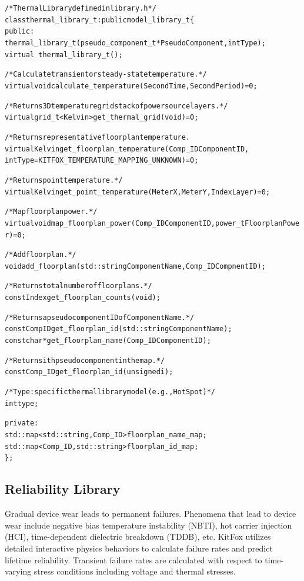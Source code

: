 {
\fontsize{10pt}{11pt}\selectfont
\begin{alltt}
/* Thermal Library defined in library.h */
class thermal_library_t : public model_library_t \{
public:
    thermal_library_t(pseudo_component_t *PseudoComponent, int Type);
    virtual ~thermal_library_t();

    /* Calculate transient or steady-state temperature. */
    virtual void calculate_temperature(Second Time, Second Period)=0;

    /* Returns 3D temperature grid stack of power source layers. */
    virtual grid_t<Kelvin> get_thermal_grid(void)=0;

    /* Returns representative floorplan temperature.
    virtual Kelvin get_floorplan_temperature(Comp_ID ComponentID, 
                                             int Type=KITFOX_TEMPERATURE_MAPPING_UNKNOWN)=0;

    /* Returns point temperature. */
    virtual Kelvin get_point_temperature(Meter X, Meter Y, Index Layer)=0;

    /* Map floorplan power. */
    virtual void map_floorplan_power(Comp_ID ComponentID, power_t FloorplanPower)=0;

    /* Add floorplan. */
    void add_floorplan(std::string ComponentName, Comp_ID CompnentID);

    /* Returns total number of floorplans. */
    const Index get_floorplan_counts(void);

    /* Returns a pseudo component ID of ComponentName. */
    const CompID get_floorplan_id(std::string ComponentName);
    const char* get_floorplan_name(Comp_ID ComponentID);

    /* Returns ith pseudo component in the map. */
    const Comp_ID get_floorplan_id(unsigned i);

    /* Type: specific thermal library model (e.g., HotSpot) */
    int type;

private:
    std::map<std::string, Comp_ID> floorplan_name_map;
    std::map<Comp_ID, std::string> floorplan_id_map;
\};
\end{alltt}
}

\subsection{Reliability Library} \label{subsec:reliability_library}
\noindent
Gradual device wear leads to permanent failures.
Phenomena that lead to device wear include negative bias temperature instability (NBTI), hot carrier injection (HCI), time-dependent dielectric breakdown (TDDB), etc.
KitFox utilizes detailed interactive physics behaviors to calculate failure rates and predict lifetime reliability.
Transient failure rates are calculated with respect to time-varying stress conditions including voltage and thermal stresses.

